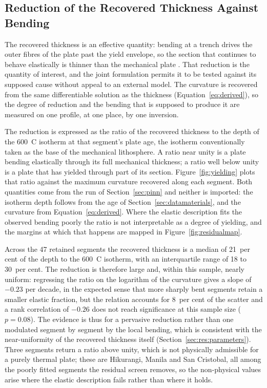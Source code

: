\documentclass[final]{agujournal2019}
\begin{document}
\subsection{Reduction of the Recovered Thickness Against Bending}\label{sec:res:yielding}
The recovered thickness is an effective quantity: bending at a trench drives the
outer fibres of the plate past the yield envelope, so the section that continues
to behave elastically is thinner than the mechanical plate
\cite{GoetzeEvans1979,WattsBurov2003}. That reduction is the quantity of
interest, and the joint formulation permits it to be tested against its supposed
cause without appeal to an external model. The curvature is recovered from the
same differentiable solution as the thickness (Equation~\eqref{eq:derived}), so
the degree of reduction and the bending that is supposed to produce it are
measured on one profile, at one place, by one inversion.

The reduction is expressed as the ratio of the recovered thickness to the depth
of the 600~\textdegree C isotherm at that segment's plate age, the isotherm
conventionally taken as the base of the mechanical lithosphere. A ratio near
unity is a plate bending elastically through its full mechanical thickness; a
ratio well below unity is a plate that has yielded through part of its section.
Figure~\ref{fig:yielding} plots that ratio against the maximum curvature
recovered along each segment. Both quantities come from the run of
Section~\ref{sec:pinn} and neither is imported: the isotherm depth follows from
the age of Section~\ref{sec:datamaterials}, and the curvature from
Equation~\eqref{eq:derived}. Where the elastic description fits the observed
bending poorly the ratio is not interpretable as a degree of yielding, and the
margins at which that happens are mapped in Figure~\ref{fig:residualmap}.

Across the 47 retained segments the recovered thickness is a median of 21~per
cent of the depth to the 600~\textdegree C isotherm, with an interquartile
range of 18 to 30~per cent. The reduction is therefore large and, within this
sample, nearly uniform: regressing the ratio on the logarithm of the curvature
gives a slope of $-0.23$ per decade, in the expected sense that more sharply
bent segments retain a smaller elastic fraction, but the relation accounts for
8~per cent of the scatter and a rank correlation of $-0.26$ does not reach
significance at this sample size ($p = 0.08$). The evidence is thus for a
pervasive reduction rather than one modulated segment by segment by the local
bending, which is consistent with the near-uniformity of the recovered
thickness itself (Section~\ref{sec:res:parameters}). Three segments return a ratio
above unity, which is not physically admissible for a purely thermal plate;
these are Hikurangi, Manila and San Cristobal, all among the poorly fitted
segments the residual screen removes, so the non-physical values arise where
the elastic description fails rather than where it holds.
\end{document}
